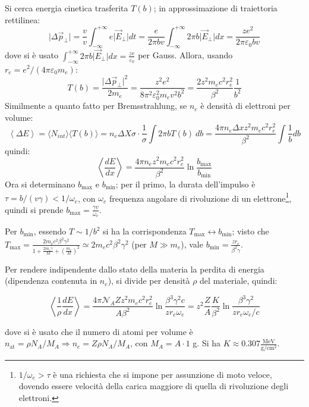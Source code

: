 \documentclass[10pt, a4paper]{scrartcl}
\numberwithin{equation}{subsection}
\theoremstyle{style1}
\newenvironment{boxenv}[1][]{
    \begin{eqbox}[#1]
    }{
   \end{eqbox}
}
\begin{document}
Si cerca energia cinetica trasferita $T(b)$; in approssimazione di traiettoria rettilinea:
\[
\lvert \Delta \vec{p}_\perp \rvert  = \frac{v}{v}\int_{-\infty} ^{+\infty} e \lvert \vec{E}_\perp \rvert  dt =  \frac{e}{2\pi b v} \int_{-\infty} ^{+\infty} 2\pi b \lvert \vec{E}_\perp \rvert dx = \frac{ze^2}{2 \pi \varepsilon _0 b v}
\] 
dove si \`e usato $\int_{-\infty} ^{+\infty} 2 \pi  b  \lvert \vec{E}_\perp\rvert dx = \frac{ze}{\varepsilon _0}$ per Gauss. Allora, usando $r_e = e^2 / (4\pi \varepsilon _0 m_e)$:
\begin{equation}
	T(b) = \frac{\lvert \Delta \vec{p}_\perp\rvert ^2}{2 m_e} = \frac{z^2 e^2 }{8 \pi^2 \varepsilon _0^2 m_e  v^2 b^2} = \frac{2 z^2 m_e c^2 r_e^2}{\beta ^2} \frac{1}{b^2}
\end{equation}
Similmente a quanto fatto per Bremsstrahlung, se $n_e $ \`e densit\`a di elettroni per volume:
\begin{equation}
		\left\langle \Delta E \right\rangle = \langle N_{int} \rangle \langle T(b) \rangle = n_e \Delta X \sigma  \cdot \frac{1}{\sigma } \int 2\pi b T(b) \ db = \frac{4 \pi n_e \Delta x  z^2 m_e c^2 r_e^2}{\beta ^2} \int \frac{1}{b} db 
\end{equation}
quindi:
\begin{equation}
	\left\langle \frac{d E}{d x}  \right\rangle = \frac{4\pi n_e z^2 m_e c^2 r_e^2}{\beta ^2}\ln \frac{b_\text{max}}{b_\text{min}}
\end{equation}	
Ora si determinano $b_\text{max}$ e $b_\text{min}$; per il primo, la durata dell'impulso \`e $\tau  = b / (v\gamma) < 1 / \omega_e$, con $\omega_e$ frequenza angolare di rivoluzione di un elettrone\footnote{$1 / \omega_e> \tau $ \`e una richiesta che si impone per assunzione di moto veloce, dovendo essere velocit\`a della carica maggiore di quella di rivoluzione degli elettroni.}, quindi si prende $b_\text{max}= \frac{\gamma v}{\omega_e}$.

Per $b_\text{min}$, essendo $T \sim 1 / b^2$ si ha la corrispondenza $T_\text{max} \leftrightarrow b_\text{min}$; visto che $T_\text{max} = \frac{2m_e c^2 \beta ^2 \gamma^2}{1 + \frac{2m_e \gamma}{M} + \left(\frac{m_e}{M}\right) ^2} \simeq 2m_e c^2 \beta ^2 \gamma^2$ (per $M \gg m_e$), vale $b_\text{min} = \frac{zr_e }{\beta ^2 \gamma}$. 

Per rendere indipendente dallo stato della materia la perdita di energia (dipendenza contenuta in $n_e$), si divide per densit\`a $\rho $ del materiale, quindi:
\begin{boxenv}[]
\begin{equation}
	\left\langle \frac{1}{\rho }\frac{d E}{d x}  \right\rangle = \frac{4\pi \mathcal{N}_A Z z^2 m_e c^2 r_e^2}{A \beta ^2} \ln \frac{\beta ^3 \gamma^2 c}{zr_e \omega_e} =z^2 \frac{Z}{A} \frac{K}{\beta ^2}\ln \frac{\beta ^3 \gamma^2}{zr_e \omega_e / c}
\end{equation}
\end{boxenv}
\noindent dove si \`e usato che il numero di atomi per volume \`e $n_\text{at} = \rho  N_A / M_A \Rightarrow  n_e = Z \rho  N_A / M_A$, con $M_A = A \cdot  1 $ g. Si ha $K \approx 0.307 \frac{\text{MeV}}{\text{g} / \text{cm}^2}$. 
\end{document}

